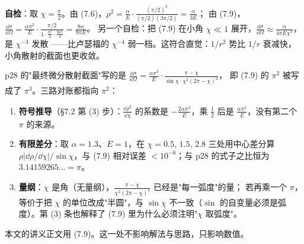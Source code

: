 \documentclass[11pt]{ctexart}
\begin{document}
\textbf{自检}：取 $\chi=\frac\pi2$。由 (7.6)，$\rho^{2}=\frac{\alpha}{E}\cdot\frac{(\pi/2)^{2}}{(\pi/2)(3\pi/2)}=\frac{\alpha}{3E}$；
由 (7.9)，$\frac{\dd\sigma}{\dd\Omega}=\frac{\alpha\pi^{2}}{E}\cdot\frac{\pi/2}{1\cdot\frac{\pi^{2}}{4}\cdot\frac{9\pi^{2}}{4}}=\frac{8\alpha}{9\pi E}$。
另一个自检：把 (7.9) 在小角 $\chi\ll1$ 展开，$\frac{\dd\sigma}{\dd\Omega}\approx\frac{\alpha}{4\pi E\chi^{3}}$，是 $\chi^{-3}$ 发散
——比卢瑟福的 $\chi^{-4}$ 弱一档。这符合直觉：$1/r^{2}$ 势比 $1/r$ 衰减快，小角散射的截面也更收敛。


p28 的"最终微分散射截面"写的是 $\frac{\dd\sigma}{\dd\Omega}=\frac{\alpha\pi^{3}}{E}\cdot\frac{\pi-\chi}{\sin\chi\cdot\chi^{2}(2\pi-\chi)^{2}}$，
即 (7.9) 的 $\pi^{2}$ 被写成了 $\pi^{3}$。三路对账都指向 $\pi^{2}$：

\begin{enumerate}[label=(\arabic*)]
\item \textbf{符号推导}（§7.2 第 (3) 步）：$\frac{\dd\rho^{2}}{\dd\chi}$ 的系数是 $-\frac{2\alpha\pi^{2}}{E}$，乘 $\frac12$ 后是 $\frac{\alpha\pi^{2}}{E}$，没有第二个 $\pi$ 的来源。
\item \textbf{有限差分}：取 $\alpha=1.3$、$E=1$，在 $\chi=0.5,\,1.5,\,2.8$ 三处用中心差分算 $\rho|\dd\rho/\dd\chi|/\sin\chi$，与 (7.9) 相对误差 $<10^{-6}$；与 p28 的式子之比恒为 $3.14159265\ldots=\pi$。
\item \textbf{量纲}：$\chi$ 是角（无量纲），$\frac{\pi-\chi}{\chi^{2}(2\pi-\chi)^{2}}$ 已经是"每一弧度"的量；
若再乘一个 $\pi$，等价于把 $\chi$ 的单位改成"半圆"，与 $\sin\chi$ 不一致（$\sin$ 的自变量必须是弧度）。第 (3) 条也解释了 (7.9) 里为什么必须注明"$\chi$ 取弧度"。
\end{enumerate}

本文的讲义正文用 (7.9)。这一处不影响解法与思路，只影响数值。



\end{document}
